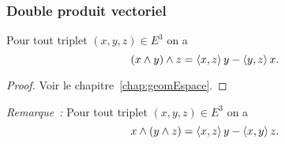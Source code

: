 \subsubsection{Double produit vectoriel}

\begin{theo}
  Pour tout triplet \((x,y,z) \in E^3\) on a
  \begin{equation}
    (x \wedge y)\wedge z = \left\langle{x},{z}\right\rangle y-\left\langle{y},{z}\right\rangle x.
  \end{equation}
\end{theo}
\begin{proof}
  Voir le chapitre~\ref{chap:geomEspace}.
\end{proof}
\emph{Remarque~:} Pour tout triplet \((x,y,z) \in E^3\) on a
\begin{equation}
  x \wedge (y \wedge z) = \left\langle{x},{z}\right\rangle y-\left\langle{x},{y}\right\rangle z.
\end{equation}
